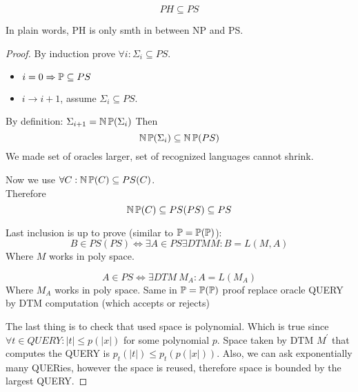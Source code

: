 \begin{theorem}
	\[ PH \subseteq PS \]

	In plain words, PH is only smth in between NP and PS.
\end{theorem}
\begin{proof}
	By induction prove $\forall i: \Sigma_i \subseteq PS$.

	\begin{itemize}
		\item $i = 0 \Rightarrow \operatorname{\mathbb{P}} \subseteq PS$
		\item $i \to i + 1$, assume $\Sigma_i \subseteq PS$.
	\end{itemize}

	By definition: $\Sigma_{i + 1} = \operatorname{\operatorname{\mathbb{N}}\mathbb{P}}(\Sigma_i)$
	Then
	\[ \operatorname{\operatorname{\mathbb{N}}\mathbb{P}}(\Sigma_i) \subseteq \operatorname{\operatorname{\mathbb{N}}\mathbb{P}}(PS) \]
	We made set of oracles larger, set of recognized languages cannot shrink.

	Now we use $\forall C: \operatorname{\operatorname{\mathbb{N}}\mathbb{P}}(C) \subseteq PS(C)$.\\
	Therefore
	\[ \operatorname{\operatorname{\mathbb{N}}\mathbb{P}}(C) \subseteq PS(PS) \subseteq PS \]

	Last inclusion is up to prove (similar to $\operatorname{\mathbb{P}} = \operatorname{\mathbb{P}}(\operatorname{\mathbb{P}})$):\\
	\[ B \in PS(PS) \iff \exists A \in PS \exists DTM M: B = L(M, A) \]
	Where $M$ works in poly space.

	\[ A \in PS \iff \exists DTM \ M_A: A = L(M_A) \]
	Where $M_A$ works in poly space.
	Same in $\operatorname{\mathbb{P}} = \operatorname{\mathbb{P}}(\operatorname{\mathbb{P}})$ proof replace oracle QUERY by DTM computation (which accepts or rejects)

	The last thing is to check that used space is polynomial.
	Which is true since $\forall t \in QUERY: |t| \leq p(|x|)$ for some polynomial $p$.
	Space taken by DTM $M^{\prime}$ that computes the QUERY is $p_t(|t|) \leq p_t(p(|x|))$.
	Also, we can ask exponentially many QUERies, however the space is reused, therefore space is bounded by the largest QUERY.
\end{proof}
